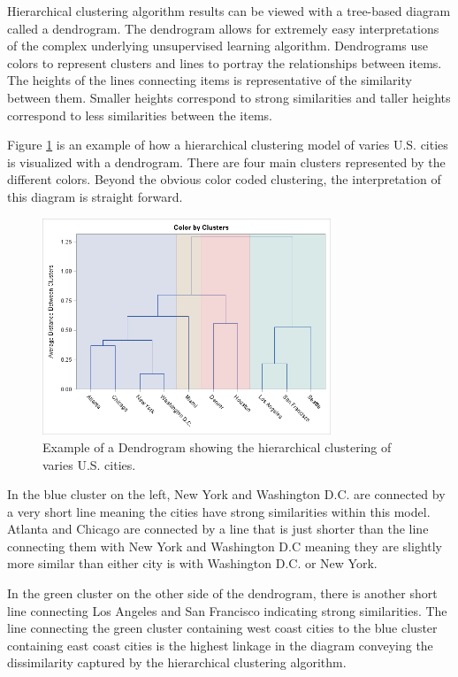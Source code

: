 \documentclass[5p,authoryear]{elsarticle}
\begin{document}
Hierarchical clustering algorithm results can be viewed with a tree-based diagram called a dendrogram. 
The dendrogram allows for extremely easy interpretations of the complex underlying unsupervised learning algorithm.
Dendrograms use colors to represent clusters and lines to portray the relationships between items. 
The heights of the lines connecting items is representative of the similarity between them. 
Smaller heights correspond to strong similarities and taller heights correspond to less similarities between the items.

Figure \ref{dendro} is an example of how a hierarchical clustering model of varies U.S. cities is visualized with a dendrogram. 
There are four main clusters represented by the different colors. 
Beyond the obvious color coded clustering, the interpretation of this diagram is straight forward. 


\begin{figure}[!htb] \centering
	\includegraphics[width=3.4in]{figures/dendrogram_example.png}
	\caption[]{Example of a Dendrogram showing the hierarchical clustering of varies U.S. cities.} 
	\label{dendro} 
\end{figure}

In the blue cluster on the left, New York and Washington D.C. are connected by a very short line meaning the cities have strong similarities within this model.
Atlanta and Chicago are connected by a line that is just shorter than the line connecting them with New York and Washington D.C meaning they are slightly more similar than either city is with Washington D.C. or New York.

In the green cluster on the other side of the dendrogram, there is another short line connecting Los Angeles and San Francisco indicating strong similarities. 
The line connecting the green cluster containing west coast cities to the blue cluster containing east coast cities is the highest linkage in the diagram conveying the dissimilarity captured by the hierarchical clustering algorithm.
\end{document}
